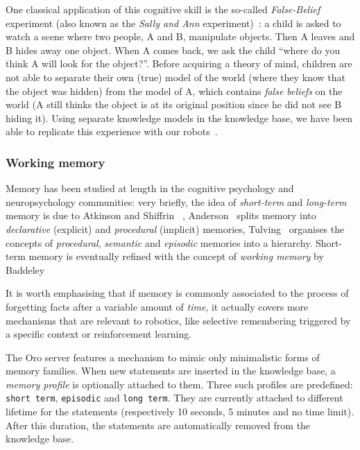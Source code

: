 \documentclass[preprint,3p,times]{elsarticle}
\begin{document}
One classical application of this cognitive skill is the so-called
\emph{False-Belief} experiment (also known as the \emph{Sally and Ann}
experiment)~\cite{Leslie2000}: a child is asked to watch a scene where two
people, A and B, manipulate objects. Then A leaves and B hides away one
object. When A comes back, we ask the child ``where do you think A will
look for the object?''. Before acquiring a theory of mind, children are not
able to separate their own (true) model of the world (where they know that
the object was hidden) from the model of A, which contains \emph{false
beliefs} on the world (A still thinks the object is at its original
position since he did not see B hiding it). Using separate knowledge models
in the knowledge base, we have been able to replicate this experience with
our robots~\cite{warnier2012when}.

\subsubsection{Working memory}
\label{memory}

Memory has been studied at length in the cognitive psychology and
neuropsychology communities: very briefly, the idea of \emph{short-term} and
\emph{long-term} memory is due to Atkinson and Shiffrin~\cite{Atkinson1968} ,
Anderson~\cite{Anderson1976} splits memory into \emph{declarative} (explicit)
and \emph{procedural} (implicit) memories, Tulving~\cite{Tulving1985} organises
the concepts of \emph{procedural}, \emph{semantic} and \emph{episodic} memories
into a hierarchy. Short-term memory is eventually refined with the concept of
\emph{working memory} by Baddeley~\cite{Baddeley2010}

It is worth emphasising that if memory is commonly associated to the process of
forgetting facts after a variable amount of \emph{time}, it actually covers
more mechanisms that are relevant to robotics, like selective remembering
triggered by a specific context or reinforcement learning.

The {\sc Oro} server features a mechanism to mimic only minimalistic forms of memory
families.  When new statements are inserted in the knowledge base, a
\emph{memory profile} is optionally attached to them.  Three such profiles are
predefined: {\tt short term}, {\tt episodic} and {\tt long term}. They are
currently attached to different lifetime for the statements (respectively 10
seconds, 5 minutes and no time limit). After this duration, the statements are
automatically removed from the knowledge base.
\end{document}
